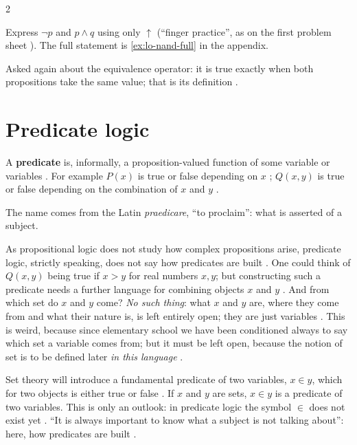 \begin{paracol}{2}
\begin{exercise}\label{ex:lo-nand}
Express $\neg p$ and $p\wedge q$ using only $\uparrow$ (``finger practice'', as on the first problem sheet
). The full statement is \cref{ex:lo-nand-full} in the appendix.
\end{exercise}

Asked again about the equivalence operator: it is true exactly when both propositions take the same value;
that is its definition .

\section{Predicate logic}\label{sec:lo-pred}

\begin{definition}\label{def:lo-predicate}
A \textbf{predicate} is, informally, a proposition-valued function of some variable or variables
. For example $P(x)$ is true or false depending on $x$ ; $Q(x,y)$ is true or false
depending on the combination of $x$ and $y$ .
\end{definition}
The name comes from the Latin \emph{praedicare}, ``to proclaim'': what is asserted of a subject.

As propositional logic does not study how complex propositions arise, predicate logic, strictly speaking, does
not say how predicates are built . One could think of $Q(x,y)$ being true if $x>y$ for real
numbers $x,y$; but constructing such a predicate needs a further language for combining objects $x$ and $y$
. And from which set do $x$ and $y$ come? \emph{No such thing}: what $x$ and $y$ are, where they
come from and what their nature is, is left entirely open; they are just variables . This is
weird, because since elementary school we have been conditioned always to say which set a variable comes from;
but it must be left open, because the notion of set is to be defined later \emph{in this language}
.

\begin{coursenote}
Set theory will introduce a fundamental predicate of two variables, $x\in y$, which for two objects is either
true or false . If $x$ and $y$ are sets, $x\in y$ is a predicate of two variables. This is only
an outlook: in predicate logic the symbol $\in$ does not exist yet . ``It is always important to
know what a subject is not talking about'': here, how predicates are built .
\end{coursenote}


\end{paracol}
